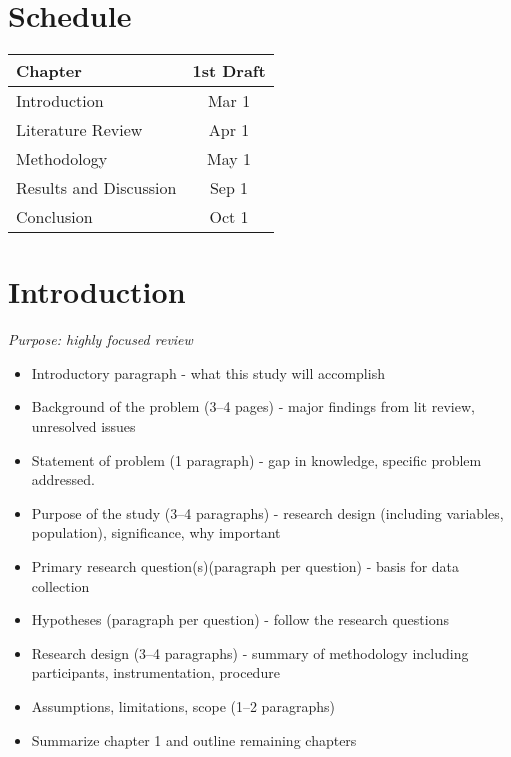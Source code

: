 
\def\baselevelheader{1}

\section{Schedule}
\label{schedule}


  \begin{tabular}{ | l || c | }
    \hline
    Chapter & 1st Draft \\ \hline
    Introduction & Mar 1 \\ \hline
    Literature Review & Apr 1 \\ \hline
    Methodology & May 1 \\ \hline
    Results and Discussion & Sep 1 \\ \hline
    Conclusion & Oct 1 \\ \hline
  \end{tabular}


\section{Introduction}
\label{introduction}

\emph{Purpose: highly focused review}

\begin{itemize}
\item Introductory paragraph - what this study will accomplish

\item Background of the problem (3--4 pages) - major findings from lit review, unresolved issues

\item Statement of problem (1 paragraph) - gap in knowledge, specific problem addressed.

\item Purpose of the study (3--4 paragraphs) - research design (including variables, population), significance, why important

\item Primary research question(s)(paragraph per question) - basis for data collection

\item Hypotheses (paragraph per question) - follow the research questions

\item Research design (3--4 paragraphs) - summary of methodology including participants, instrumentation, procedure

\item Assumptions, limitations, scope (1--2 paragraphs)

\item Summarize chapter 1 and outline remaining chapters

\end{itemize}

